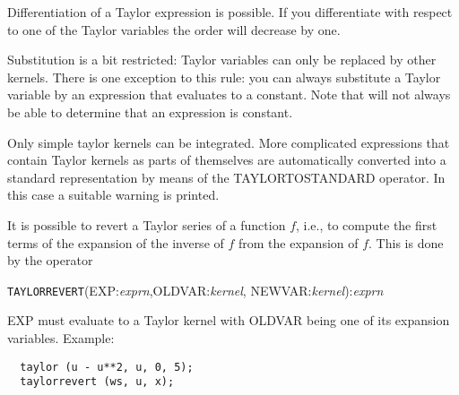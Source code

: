 Differentiation of a Taylor expression is possible.  If you
differentiate with respect to one of the Taylor variables the order
will decrease by one.

Substitution is a bit restricted: Taylor variables can only be replaced
by other kernels.  There is one exception to this rule: you can always
substitute a Taylor variable by an expression that evaluates to a
constant.  Note that \REDUCE{} will not always be able to determine
that an expression is constant.

Only simple taylor kernels can be integrated. More complicated
expressions that contain Taylor kernels as parts of themselves are
automatically converted into a standard representation by means of the
TAYLORTOSTANDARD operator. In this case a suitable warning is printed.

 It is possible to revert a Taylor
series of a function $f$, i.e., to compute the first terms of the
expansion of the inverse of $f$ from the expansion of $f$. This is
done by the operator

\hspace*{2em} {\tt TAYLORREVERT}(EXP:{\em exprn},OLDVAR:{\em kernel},
                                 NEWVAR:{\em kernel}):{\em exprn}

EXP must evaluate to a Taylor kernel with OLDVAR being one of its
expansion variables. Example:

\begin{verbatim}
  taylor (u - u**2, u, 0, 5);
  taylorrevert (ws, u, x);
\end{verbatim}

